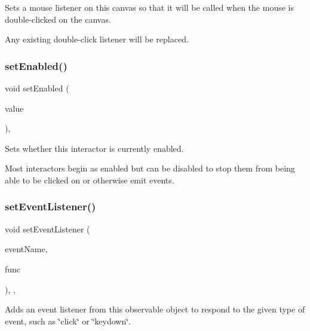 Sets a mouse listener on this canvas so that it will be called when the mouse is double-\/clicked on the canvas. 

Any existing double-\/click listener will be replaced. \mbox{\label{classGInteractor_ab831367dd84bbd579e02e55bacb21343}} 
\subsubsection{\texorpdfstring{set\+Enabled()}{setEnabled()}}
{\footnotesize\ttfamily void set\+Enabled (\begin{DoxyParamCaption}\item[{bool}]{value }\end{DoxyParamCaption})\hspace{0.3cm}{\ttfamily [virtual]}, {\ttfamily [inherited]}}



Sets whether this interactor is currently enabled. 

Most interactors begin as enabled but can be disabled to stop them from being able to be clicked on or otherwise emit events. \mbox{\label{classGObservable_ad2f6d34961c50f6c1e0659990b79f741}} 
\subsubsection{\texorpdfstring{set\+Event\+Listener()}{setEventListener()}\hspace{0.1cm}{\footnotesize\ttfamily [1/2]}}
{\footnotesize\ttfamily void set\+Event\+Listener (\begin{DoxyParamCaption}\item[{const std\+::string \&}]{event\+Name,  }\item[{G\+Event\+Listener}]{func }\end{DoxyParamCaption})\hspace{0.3cm}{\ttfamily [protected]}, {\ttfamily [virtual]}, {\ttfamily [inherited]}}



Adds an event listener from this observable object to respond to the given type of event, such as \char`\"{}click\char`\"{} or \char`\"{}keydown\char`\"{}. 

